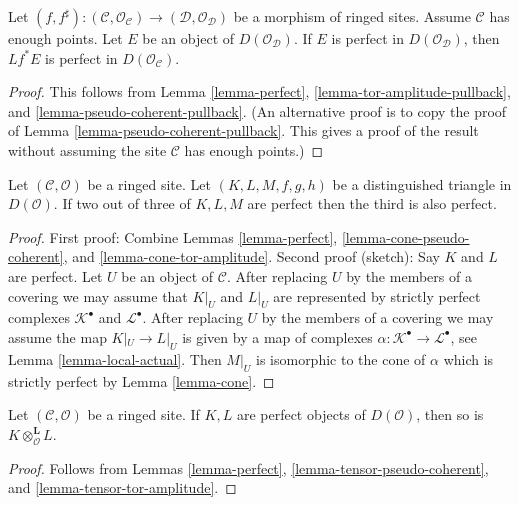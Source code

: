 \begin{lemma}
\label{lemma-perfect-pullback}
Let $(f, f^\sharp) : (\mathcal{C}, \mathcal{O}_\mathcal{C}) \to
(\mathcal{D}, \mathcal{O}_\mathcal{D})$
be a morphism of ringed sites. Assume $\mathcal{C}$ has enough points.
Let $E$ be an object of $D(\mathcal{O}_\mathcal{D})$.
If $E$ is perfect in $D(\mathcal{O}_\mathcal{D})$,
then $Lf^*E$ is perfect in $D(\mathcal{O}_\mathcal{C})$.
\end{lemma}

\begin{proof}
This follows from Lemma \ref{lemma-perfect},
\ref{lemma-tor-amplitude-pullback}, and
\ref{lemma-pseudo-coherent-pullback}.
(An alternative proof is to copy the proof of
Lemma \ref{lemma-pseudo-coherent-pullback}. This gives a proof
of the result without assuming the site $\mathcal{C}$ has enough points.)
\end{proof}

\begin{lemma}
\label{lemma-two-out-of-three-perfect}
Let $(\mathcal{C}, \mathcal{O})$ be a ringed site. Let $(K, L, M, f, g, h)$
be a distinguished triangle in $D(\mathcal{O})$. If two out of three of
$K, L, M$ are perfect then the third is also perfect.
\end{lemma}

\begin{proof}
First proof: Combine
Lemmas \ref{lemma-perfect}, \ref{lemma-cone-pseudo-coherent}, and
\ref{lemma-cone-tor-amplitude}.
Second proof (sketch): Say $K$ and $L$ are perfect. Let $U$ be an object
of $\mathcal{C}$. After replacing
$U$ by the members of a covering we may assume that $K|_U$ and $L|_U$
are represented by strictly perfect complexes $\mathcal{K}^\bullet$
and $\mathcal{L}^\bullet$. After replacing $U$ by the members
of a covering we may assume the map $K|_U \to L|_U$ is given by
a map of complexes $\alpha : \mathcal{K}^\bullet \to \mathcal{L}^\bullet$,
see Lemma \ref{lemma-local-actual}.
Then $M|_U$ is isomorphic to the cone of $\alpha$ which is strictly
perfect by Lemma \ref{lemma-cone}.
\end{proof}

\begin{lemma}
\label{lemma-tensor-perfect}
Let $(\mathcal{C}, \mathcal{O})$ be a ringed site.
If $K, L$ are perfect objects of $D(\mathcal{O})$, then
so is $K \otimes_\mathcal{O}^\mathbf{L} L$.
\end{lemma}

\begin{proof}
Follows from
Lemmas \ref{lemma-perfect}, \ref{lemma-tensor-pseudo-coherent}, and
\ref{lemma-tensor-tor-amplitude}.
\end{proof}


